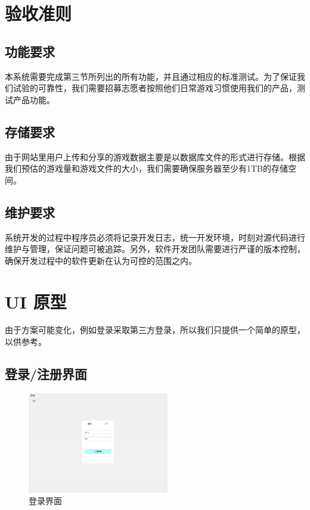 \documentclass[12pt]{ctexart} %
\begin{document}
\section{验收准则}
\subsection{功能要求}
本系统需要完成第三节所列出的所有功能，并且通过相应的标准测试。为了保证我们试验的可靠性，我们需要招募志愿者按照他们日常游戏习惯使用我们的产品，测试产品功能。

\subsection{存储要求}
由于网站里用户上传和分享的游戏数据主要是以数据库文件的形式进行存储。根据我们预估的游戏量和游戏文件的大小，我们需要确保服务器至少有1TB的存储空间。
\subsection{维护要求}
系统开发的过程中程序员必须将记录开发日志，统一开发环境，时刻对源代码进行维护与管理，保证问题可被追踪。另外，软件开发团队需要进行严谨的版本控制，确保开发过程中的软件更新在认为可控的范围之内。
\section{UI 原型}

由于方案可能变化，例如登录采取第三方登录，所以我们只提供一个简单的原型，以供参考。

\subsection{登录/注册界面}

\begin{figure}[htbp]
  \centering
  \includegraphics[width=0.55\textwidth]{login.jpg}
  \caption{登录界面}
\end{figure}
\end{document}
